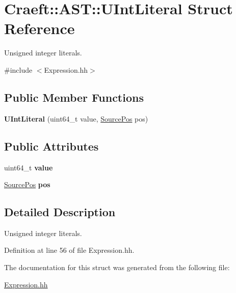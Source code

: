 \hypertarget{struct_craeft_1_1_a_s_t_1_1_u_int_literal}{}\section{Craeft\+:\+:A\+ST\+:\+:U\+Int\+Literal Struct Reference}
\label{struct_craeft_1_1_a_s_t_1_1_u_int_literal}


Unsigned integer literals.  




{\ttfamily \#include $<$Expression.\+hh$>$}

\subsection*{Public Member Functions}
\begin{DoxyCompactItemize}
\item 
\hypertarget{struct_craeft_1_1_a_s_t_1_1_u_int_literal_a0ba04a1f2d84bd7b25292a0d5f4c6bd8}{}\label{struct_craeft_1_1_a_s_t_1_1_u_int_literal_a0ba04a1f2d84bd7b25292a0d5f4c6bd8} 
{\bfseries U\+Int\+Literal} (uint64\+\_\+t value, \hyperlink{struct_craeft_1_1_source_pos}{Source\+Pos} pos)
\end{DoxyCompactItemize}
\subsection*{Public Attributes}
\begin{DoxyCompactItemize}
\item 
\hypertarget{struct_craeft_1_1_a_s_t_1_1_u_int_literal_a3dec720d3171bca88cc94f03b53e9d35}{}\label{struct_craeft_1_1_a_s_t_1_1_u_int_literal_a3dec720d3171bca88cc94f03b53e9d35} 
uint64\+\_\+t {\bfseries value}
\item 
\hypertarget{struct_craeft_1_1_a_s_t_1_1_u_int_literal_ac4a1cf0179981a33d2278918ea5ff155}{}\label{struct_craeft_1_1_a_s_t_1_1_u_int_literal_ac4a1cf0179981a33d2278918ea5ff155} 
\hyperlink{struct_craeft_1_1_source_pos}{Source\+Pos} {\bfseries pos}
\end{DoxyCompactItemize}


\subsection{Detailed Description}
Unsigned integer literals. 

Definition at line 56 of file Expression.\+hh.



The documentation for this struct was generated from the following file\+:\begin{DoxyCompactItemize}
\item 
\hyperlink{_expression_8hh}{Expression.\+hh}\end{DoxyCompactItemize}
